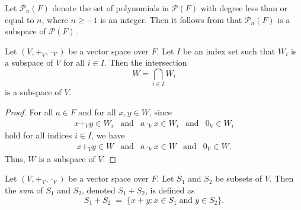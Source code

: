 \begin{example}
  Let $\mathcal{P}_n(F)$ denote the set of polynomials in $\mathcal{P}(F)$
  with degree less than or equal to $n$, where $n \geq -1$ is an integer.
  Then it follows from  that $\mathcal{P}_n(F)$ is
  a subspace of $\mathcal{P}(F)$.
\end{example}

\begin{theorem}\label{thm:intersection}
  Let $(V, +_V, \cdot_V)$ be a vector space over $F$.
  Let $I$ be an index set such that $W_i$ is a subspace of $V$
  for all $i \in I$.
  Then the intersection
  \begin{equation*}
    W = \bigcap_{i \in I} W_i
  \end{equation*}
  is a subspace of $V$.
\end{theorem}
\begin{proof}
  For all $a \in F$ and for all $x, y \in W$, since
  \begin{equation*}
    \begin{array}{lllll}
      x +_V y \in W_i
      & \text{and}
      & a \cdot_V x \in W_i
      & \text{and}
      & 0_V \in W_i
    \end{array}
  \end{equation*}
  hold for all indices $i \in I$, we have
  \begin{equation*}
    \begin{array}{lllll}
      x +_V y \in W
      & \text{and}
      & a \cdot_V x \in W
      & \text{and}
      & 0_V \in W.
    \end{array}
  \end{equation*}
  Thus, $W$ is a subspace of $V$.
\end{proof}

\begin{definition}\label{def:sum-of-sets}
  Let $(V, +_V, \cdot_V)$ be a vector space over $F$.
  Let $S_1$ and $S_2$ be subsets of $V$.
  Then the \emph{sum} of $S_1$ and $S_2$, denoted $S_1 + S_2$,
  is defined as
  \begin{equation*}
    S_1 + S_2 \; = \; \{x + y: x \in S_1 \;\text{and}\; y \in S_2\}.
  \end{equation*}
\end{definition}

